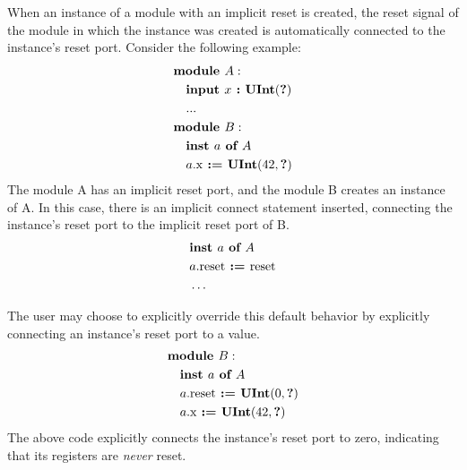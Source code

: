 \documentclass[12pt]{article}
\begin{document}
When an instance of a module with an implicit reset is created, the reset signal of the module in which the instance was created is automatically connected to the instance's reset port. Consider the following example:
\[
\begin{aligned}
&\kw{module} A :                               \\
&\quad \kw{input} x \kw{ :} \kws{UInt}(\kws{?})\\
&\quad   ...                                   \\
&\kw{module} B :                               \\
&\quad \kw{inst} a \kw{ of} A                  \\
&\quad a.\text{x} \kw{ :=} \kws{UInt}(42, \kws{?})    \\
\end{aligned}
\]
The module A has an implicit reset port, and the module B creates an instance of A. In this case, there is an implicit connect statement inserted, connecting the instance's reset port to the implicit reset port of B. 
\[
\begin{aligned}
&\kw{inst} a \kw{ of} A                  \\
&a.\text{reset} \kw{ :=} \text{reset}    \\
&\ldots
\end{aligned}
\]

The user may choose to explicitly override this default behavior by explicitly connecting an instance's reset port to a value.
\[
\begin{aligned}
&\kw{module} B :                                       \\
&\quad \kw{inst} a \kw{ of} A                          \\
&\quad a.\text{reset} \kw{ :=} \kws{UInt}(0, \kws{?})  \\
&\quad a.\text{x} \kw{ :=} \kws{UInt}(42, \kws{?})     \\
\end{aligned}
\]
The above code explicitly connects the instance's reset port to zero, indicating that its registers are {\em never} reset. 
\end{document}
